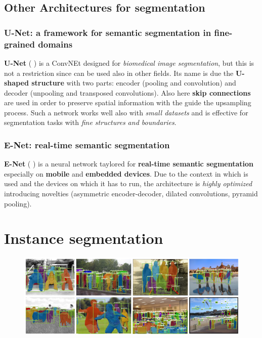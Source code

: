 \subsection{Other Architectures for segmentation}

\subsubsection{\textsf{U-Net: a framework for semantic segmentation in fine-grained domains}}
\textbf{U-Net} (\citeauthor{ronneberger2015u} \citeauthor{ronneberger2015u}) is a ConvNEt designed for \textit{biomedical image segmentation}, but this is not a restriction since can be used also in other fields. Its name is due the \textbf{U-shaped structure} with two parts: encoder (pooling and convolution) and decoder (unpooling and transposed convolutions). Also here \textbf{skip connections} are used in order to preserve spatial information with the guide the upsampling process. Such a network works well also with \textit{small datasets} and is effective for segmentation tasks with \textit{fine structures and boundaries}.

\subsubsection{\textsf{E-Net: real-time semantic segmentation}}
\textbf{E-Net} (\citeauthor{paszke2016enet} \cite{paszke2016enet}) is a neural network taylored for \textbf{real-time semantic segmentation} especially on \textbf{mobile} and \textbf{embedded devices}. Due to the context in which is used and the devices on which it has to run, the architecture is \textit{highly optimized} introducing novelties (asymmetric encoder-decoder, dilated convolutions, pyramid pooling).
    
\section{Instance segmentation}
\begin{figure}[h]
    \centering
    \includegraphics[scale=0.8]{img/InstanceSeg.png}
\end{figure}

